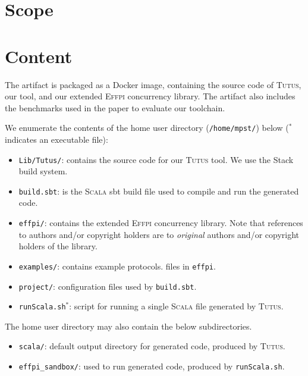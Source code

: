 \documentclass[a4paper,UKenglish]{darts-v2021}
\newenvironment{scope}{\section{Scope}}{}
\newenvironment{content}{\section{Content}}{}
\newcommand{\Scribble}[0]{\textsc{Scribble}\xspace}
\newcommand{\Effpi}[0]{\textsc{Effpi}\xspace}
\newcommand{\newTool}[0]{\textsc{Tutus}\xspace}
\newcommand{\Scala}[0]{\textsc{Scala}\xspace}
\newcommand{\nuScr}[0]{\texorpdfstring{$\nu$\textsc{Scr}}{nuScr}\xspace}
\begin{document}
\begin{scope}
\iffalse
Our paper presents \newTool, a code generation toolchain that utilises
asynchronous \emph{multiparty session types} (MPST) with \emph{crash-stop} semantics to
support failure handling protocols.
The tool generates \Scala code that uses the \Effpi concurrency
library~\cite{PLDI19Effpi}.

\newTool accepts a subset of the \Scribble syntax~\cite{YHNN2013} accepted by
\nuScr, with two extensions to support our crash-handling model.
Code generated by \newTool uses an extended form of the \Effpi concurrency
library.
For more details, please consult the \texttt{README} file in the artifact.
\fi
\end{scope}

\begin{content}
The artifact is packaged as a Docker image, containing the source code of
\newTool, our tool, and our extended \Effpi concurrency library.
The artifact also includes the benchmarks used in the paper to evaluate our
toolchain.

We enumerate the contents of the home user directory (\texttt{/home/mpst/})
below ($^{*}$ indicates an executable file):
\begin{itemize}
\item \texttt{Lib/Tutus/}: contains the source code for our \newTool tool.
  We use the Stack build system.
\item \texttt{build.sbt}: is the \Scala sbt build file used to compile and run
  the generated code.
\item \texttt{effpi/}: contains the extended \Effpi concurrency library.
  Note that references to authors and/or copyright holders are to
  \emph{original} authors and/or copyright holders of the library.
\item \texttt{examples/}: contains example protocols.
  files in \texttt{effpi}.
\item \texttt{project/}: configuration files used by \texttt{build.sbt}.
\item \texttt{runScala.sh}$^{*}$: script for running a single \Scala file
  generated by \newTool.
\end{itemize}

\noindent
The home user directory may also contain the below subdirectories.

\begin{itemize}
\item \texttt{scala/}: default output directory for generated code, produced
  by \newTool.
\item \texttt{effpi\_sandbox/}:
  used to run generated code, produced by \texttt{runScala.sh}.
\end{itemize}

\end{content}
\end{document}
